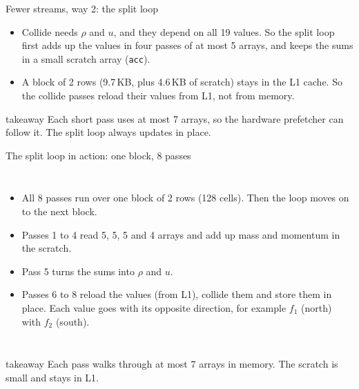 \documentclass[aspectratio=169,10pt,t]{beamer}
\newcommand{\code}[1]{\texttt{#1}}
\newcommand{\takeaway}[1]{\par\vfill
  \begin{beamercolorbox}[wd=\textwidth,sep=4pt,rounded=true]{takeaway}
    \small #1
  \end{beamercolorbox}}
\begin{document}
\begin{frame}{Fewer streams, way 2: the split loop}
  \vspace{2mm}
  \centering

  \vspace{2mm}
  \raggedright
  \begin{itemize}\small
    \item Collide needs $\rho$ and $u$, and they depend on all 19 values. So the split loop first adds up the values
          in four passes of at most 5 arrays, and keeps the sums in a small scratch array (\code{acc}).
    \item A block of 2 rows (9.7\,KB, plus 4.6\,KB of scratch) stays in the L1 cache. So the collide passes reload
          their values from L1, not from memory.
  \end{itemize}
  \takeaway{Each short pass uses at most 7 arrays, so the hardware prefetcher can follow it. The split loop always
    updates in place.}
\end{frame}

\begin{frame}{The split loop in action: one block, 8 passes}
  \begin{columns}[T,onlytextwidth]
    \vspace{0mm}
    \centering
    \vspace{3mm}
    \begin{itemize}\small
      \item All 8 passes run over one block of 2 rows (128 cells). Then the loop moves on to the next block.
      \item Passes 1 to 4 read 5, 5, 5 and 4 arrays and add up mass and momentum in the scratch.
      \item Pass 5 turns the sums into $\rho$ and $u$.
      \item Passes 6 to 8 reload the values (from L1), collide them and store them in place. Each value goes
            with its opposite direction, for example $f_1$ (north) with $f_2$ (south).
    \end{itemize}
  \end{columns}
  \takeaway{Each pass walks through at most 7 arrays in memory. The scratch is small and stays in L1.}
\end{frame}
\end{document}

